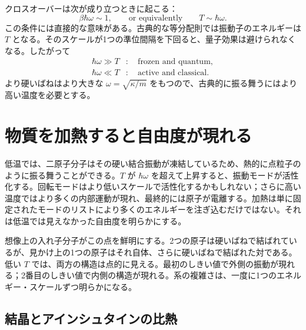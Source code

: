 クロスオーバーは次が成り立つときに起こる：
\begin{equation}
 \beta\hbar\omega\sim1,
 \qquad\text{or equivalently}\qquad
 T\sim\hbar\omega.
 \label{eq:sm7-crossover}
\end{equation}
この条件には直接的な意味がある。古典的な等分配則では振動子のエネルギーは \(T\) となる。そのスケールが1つの準位間隔を下回ると、量子効果は避けられなくなる。したがって
\begin{equation}
\begin{aligned}
 \hbar\omega\gg T&:\quad \text{frozen and quantum},\\
 \hbar\omega\ll T&:\quad \text{active and classical}.
\end{aligned}
 \label{eq:sm7-regimes}
\end{equation}
より硬いばねはより大きな \(\omega=\sqrt{\kappa/m}\) をもつので、古典的に振る舞うにはより高い温度を必要とする。

\section{物質を加熱すると自由度が現れる}

低温では、二原子分子はその硬い結合振動が凍結しているため、熱的に点粒子のように振る舞うことができる。\(T\) が \(\hbar\omega\) を超えて上昇すると、振動モードが活性化する。回転モードはより低いスケールで活性化するかもしれない；さらに高い温度ではより多くの内部運動が現れ、最終的には原子が電離する。加熱は単に固定されたモードのリストにより多くのエネルギーを注ぎ込むだけではない。それは低温では見えなかった自由度を明らかにする。

想像上の入れ子分子がこの点を鮮明にする。2つの原子は硬いばねで結ばれているが、見かけ上の1つの原子はそれ自体、さらに硬いばねで結ばれた対である。低い \(T\) では、両方の構造は点的に見える。最初のしきい値で外側の振動が現れる；2番目のしきい値で内側の構造が現れる。系の複雑さは、一度に1つのエネルギー・スケールずつ明らかになる。

\begin{classroomqa}
\end{classroomqa}

\subsection{結晶とアインシュタインの比熱}

